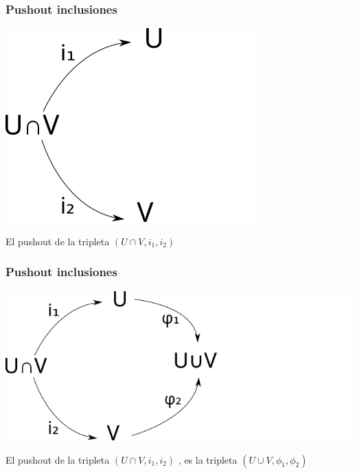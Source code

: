 \documentclass[xetex,mathserif,serif]{beamer}
\begin{document}
  \begin{frame}
    \frametitle{Pushout inclusiones}
    \begin{center}
       \includegraphics[scale=0.5]{./imag/push-inc-1.png}
    \end{center}
    El pushout de la tripleta \(\left( U \cap V, i_1, i_2 \right)\)
  \end{frame}

  \begin{frame}
    \frametitle{Pushout inclusiones}
    \begin{center}
       \includegraphics[scale=0.5]{./imag/push-inc-2.png}
    \end{center}
    El pushout de la tripleta \(\left( U \cap V, i_1, i_2 \right)\) , es
    la tripleta \(\left( U \cup V, \phi_1, \phi_2 \right)\)
  \end{frame}
\end{document}
